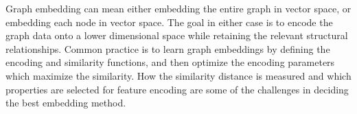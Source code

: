 Graph embedding can mean either embedding the entire graph in vector space, or embedding each node in vector space. The goal in either case is to encode the graph data onto a lower dimensional space while retaining the relevant structural relationships. Common practice is to learn graph embeddings by defining the encoding and similarity functions, and then optimize the encoding parameters which maximize the similarity. How the similarity distance is measured and which properties are selected for feature encoding are some of the challenges in deciding the best embedding method\cite{Goyal_Ferrara_2018}. 




